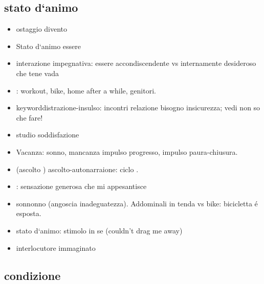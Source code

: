 \subsection{stato d‘animo}

\begin{itemize}
\item ostaggio  divento 
\item Stato d‘animo essere 
\item interazione impegnativa: essere accondiscendente vs internamente desideroso che tene vada
\item {}: workout, bike, home after a while, genitori.
\item keyword{distrazione-insulso}: incontri relazione bisogno insicurezza; vedi non so che fare!
\item {} studio soddisfazione
\item Vacanza: sonno, mancanza impulso progresso, impulso paura-chiusura.
\item (ascolto ) ascolto-autonarraione: ciclo .
\item {}: sensazione generosa che mi appesantisce
\item sonnonno (angoscia inadeguatezza).
Addominali in tenda vs bike: bicicletta \'e esposta.
\item stato d‘animo: stimolo in se (couldn't drag me away)
\item interlocutore immaginato
\end{itemize}

\subsection{condizione}

